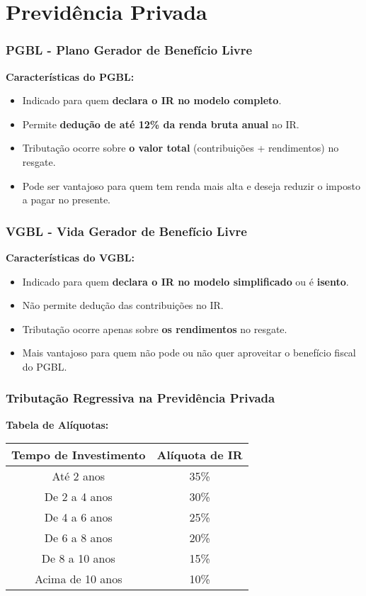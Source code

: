 \section{Previdência Privada}

\begin{frame}[t]\frametitle{PGBL - Plano Gerador de Benefício Livre}
  \textbf{Características do PGBL:}
  \begin{itemize}
    \item Indicado para quem \textbf{declara o IR no modelo completo}.
    \item Permite \textbf{dedução de até 12\% da renda bruta anual} no IR.
    \item Tributação ocorre sobre \textbf{o valor total} (contribuições + rendimentos) no resgate.
    \item Pode ser vantajoso para quem tem renda mais alta e deseja reduzir o imposto a pagar no presente.
  \end{itemize}
\end{frame}

\begin{frame}[t]\frametitle{VGBL - Vida Gerador de Benefício Livre}
  \textbf{Características do VGBL:}
  \begin{itemize}
    \item Indicado para quem \textbf{declara o IR no modelo simplificado} ou é \textbf{isento}.
    \item Não permite dedução das contribuições no IR.
    \item Tributação ocorre apenas sobre \textbf{os rendimentos} no resgate.
    \item Mais vantajoso para quem não pode ou não quer aproveitar o benefício fiscal do PGBL.
  \end{itemize}
\end{frame}

\begin{frame}[t]\frametitle{Tributação Regressiva na Previdência Privada}

  \vspace{0.5cm}
  \textbf{Tabela de Alíquotas:}

  \begin{table}[]
    \centering
    \begin{tabular}{|c|c|}
      \hline
      \textbf{Tempo de Investimento} & \textbf{Alíquota de IR} \\ \hline
      Até 2 anos                     & 35\%                    \\ \hline
      De 2 a 4 anos                  & 30\%                    \\ \hline
      De 4 a 6 anos                  & 25\%                    \\ \hline
      De 6 a 8 anos                  & 20\%                    \\ \hline
      De 8 a 10 anos                 & 15\%                    \\ \hline
      Acima de 10 anos               & 10\%                    \\ \hline
    \end{tabular}
  \end{table}
\end{frame}

